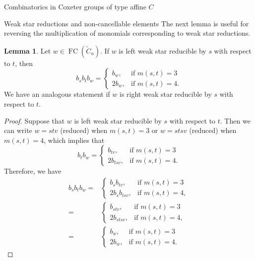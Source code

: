 \documentclass[11pt]{amsart}
\theoremstyle{definition}
\newtheorem{lemma}[theorem]{Lemma}
\numberwithin{equation}{section}
\newcommand{\C}{\widetilde{C}}
\renewcommand{\(}{\left(}
\renewcommand{\)}{\right)}
\DeclareMathOperator{\FC}{FC}
\begin{document}
\begin{section}{Combinatorics in Coxeter groups of type affine $C$}
\begin{subsection}{Weak star reductions and non-cancellable elements}
The next lemma is useful for reversing the multiplication of monomials corresponding to weak star reductions.

\begin{lemma}\label{lem:weak star reverse}
Let $w \in \FC(\C_{n})$. If $w$ is left weak star reducible by $s$ with respect to $t$, then
\[
b_{s}b_{t}b_{w}=\begin{cases}
b_{w},   & \text{if } m(s,t)=3\\
2b_{w},   & \text{if } m(s,t)=4.
\end{cases}
\]
We have an analogous statement if $w$ is right weak star reducible by $s$ with respect to $t$.
\end{lemma}

\begin{proof}
Suppose that $w$ is left weak star reducible by $s$ with respect to $t$.  Then we can write $w=stv$ (reduced) when $m(s,t)=3$ or $w=stsv$ (reduced) when $m(s,t)=4$, which implies that
\[
b_{t}b_{w}=\begin{cases}
b_{tv},   & \text{if } m(s,t)=3\\
2b_{tsv},   & \text{if } m(s,t)=4.
\end{cases}
\]
Therefore, we have
{\allowdisplaybreaks
\begin{align*}
b_{s}b_{t}b_{w}=&\begin{cases}
b_{s}b_{tv},   & \text{if } m(s,t)=3\\
2b_{s}b_{tsv},   & \text{if } m(s,t)=4,
\end{cases}\\
=& \begin{cases}
b_{stv},   & \text{if } m(s,t)=3\\
2b_{stsv},   & \text{if } m(s,t)=4,
\end{cases}\\
=& \begin{cases}
b_{w},   & \text{if } m(s,t)=3\\
2b_{w},   & \text{if } m(s,t)=4.
\end{cases}
\end{align*}}%
\end{proof}

\end{subsection}

\end{section}

\end{document}
